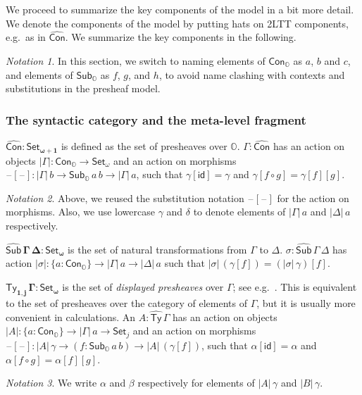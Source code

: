 \documentclass[acmsmall]{acmart}
\newcommand{\msf}[1]{\mathsf{#1}}
\newcommand{\mbb}[1]{\mathbb{#1}}
\newcommand{\bs}[1]{\boldsymbol{#1}}
\newcommand{\wh}[1]{\widehat{#1}}
\newcommand{\mbbo}{\mbb{O}}
\newcommand{\Con}{\msf{Con}}
\newcommand{\Cono}{\msf{Con}_{\mbbo}}
\newcommand{\Subo}{\msf{Sub}_{\mbbo}}
\newcommand{\hCon}{\wh{\msf{Con}}}
\newcommand{\hSub}{\wh{\msf{Sub}}}
\newcommand{\hTy}{\wh{\msf{Ty}}}
\newcommand{\id}{\msf{id}}
\newcommand{\Set}{\mathsf{Set}}
\newcommand{\blank}{{\mathord{\hspace{1pt}\text{--}\hspace{1pt}}}}
\theoremstyle{remark}
\newtheorem{notation}{Notation}
\begin{document}
We proceed to summarize the key components of the model in a bit more detail. We
denote the components of the model by putting hats on 2LTT components, e.g.\ as
in $\hCon$. We summarize the key components in the following.

\begin{notation}
In this section, we switch to naming elements of $\Cono$ as $a$, $b$ and $c$,
and elements of $\Subo$ as $f$, $g$, and $h$, to avoid name clashing with
contexts and substitutions in the presheaf model.
\end{notation}

\subsubsection{The syntactic category and the meta-level fragment}

\begin{definition} $\bs{\wh{\Con} : \Set_{\omega+1}}$ is defined as the set of presheaves
over $\mbbo$. $\Gamma : \wh{\Con}$ has an action on objects $|\Gamma| :
\Cono \to \Set_\omega$ and an action on morphisms $\blank[\blank] : |\Gamma|\,b
\to \Subo\,a\,b \to |\Gamma|\,a$, such that $\gamma[\id] = \gamma$ and
$\gamma[f\circ g] = \gamma[f][g]$.

\begin{notation}
Above, we reused the substitution notation $\blank[\blank]$ for the action on
morphisms.  Also, we use lowercase $\gamma$ and $\delta$ to denote elements of
$|\Gamma|\,a$ and $|\Delta|\,a$ respectively.
\end{notation}

\end{definition}
\begin{definition} $\bs{\hSub\,\Gamma\,\Delta : \Set_\omega}$ is the set of natural transformations
from $\Gamma$ to $\Delta$. $\sigma : \hSub\,\Gamma\,\Delta$ has action
$|\sigma| : \{a : \Cono\} \to |\Gamma|\,a \to |\Delta|\,a$ such that
$|\sigma|\,(\gamma[f]) = (|\sigma|\,\gamma)[f]$.
\end{definition}

\begin{definition}
$\bs{\hTy_{1,j}\,\Gamma : \Set_\omega}$ is the set of \emph{displayed
presheaves} over $\Gamma$; see e.g.\ \cite[Chapter~1.2]{huber-thesis}. This is
equivalent to the set of presheaves over the category of elements of $\Gamma$,
but it is usually more convenient in calculations. An $A : \hTy\,\Gamma$ has
an action on objects $|A| : \{a : \Cono\} \to |\Gamma|\,a \to \Set_j$ and an
action on morphisms $\blank[\blank] : |A|\,\gamma \to (f : \Subo\,a\,b) \to
|A|\,(\gamma[f])$, such that $\alpha[\id] = \alpha$ and $\alpha[f \circ g] =
\alpha[f][g]$.

\begin{notation}
  We write $\alpha$ and $\beta$ respectively for elements of $|A|\,\gamma$ and
  $|B|\,\gamma$.
\end{notation}
\end{definition}
\end{document}
